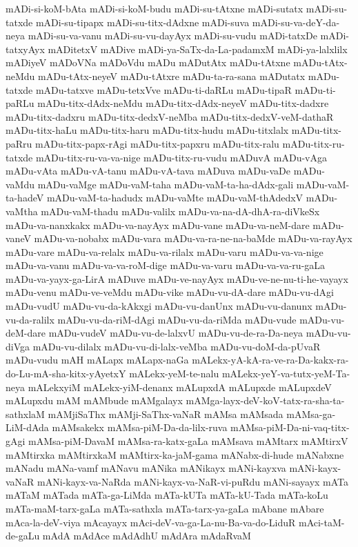 {mADi-si-koM-bAta
mADi-si-koM-budu
mADi-su-tAtxne
mADi-sutatx
mADi-su-tatxde
mADi-su-tipapx
mADi-su-titx-dAdxne
mADi-suva
mADi-su-va-deY-da-neya
mADi-su-va-vanu
mADi-su-vu-dayAyx
mADi-su-vudu
mADi-tatxDe
mADi-tatxyAyx
mADitetxV
mADive
mADi-ya-SaTx-da-La-padamxM
mADi-ya-lalxlilx
mADiyeV
mADoVNa
mADoVdu
mADu
mADutAtx
mADu-tAtxne
mADu-tAtx-neMdu
mADu-tAtx-neyeV
mADu-tAtxre
mADu-ta-ra-sana
mADutatx
mADu-tatxde
mADu-tatxve
mADu-tetxVve
mADu-ti-daRLu
mADu-tipaR
mADu-ti-paRLu
mADu-titx-dAdx-neMdu
mADu-titx-dAdx-neyeV
mADu-titx-dadxre
mADu-titx-dadxru
mADu-titx-dedxV-neMba
mADu-titx-dedxV-veM-dathaR
mADu-titx-haLu
mADu-titx-haru
mADu-titx-hudu
mADu-titxlalx
mADu-titx-paRru
mADu-titx-papx-rAgi
mADu-titx-papxru
mADu-titx-ralu
mADu-titx-ru-tatxde
mADu-titx-ru-va-va-nige
mADu-titx-ru-vudu
mADuvA
mADu-vAga
mADu-vAta
mADu-vA-tanu
mADu-vA-tava
mADuva
mADu-vaDe
mADu-vaMdu
mADu-vaMge
mADu-vaM-taha
mADu-vaM-ta-ha-dAdx-gali
mADu-vaM-ta-hadeV
mADu-vaM-ta-hadudx
mADu-vaMte
mADu-vaM-thAdedxV
mADu-vaMtha
mADu-vaM-thadu
mADu-valilx
mADu-va-na-dA-dhA-ra-diVkeSx
mADu-va-nanxkakx
mADu-va-nayAyx
mADu-vane
mADu-va-neM-dare
mADu-vaneV
mADu-va-nobabx
mADu-vara
mADu-va-ra-ne-na-baMde
mADu-va-rayAyx
mADu-vare
mADu-va-relalx
mADu-va-rilalx
mADu-varu
mADu-va-va-nige
mADu-va-vanu
mADu-va-va-roM-dige
mADu-va-varu
mADu-va-va-ru-gaLa
mADu-va-yayx-ga-LirA
mADuve
mADu-ve-nayAyx
mADu-ve-ne-nu-ti-he-vayayx
mADu-venu
mADu-ve-veMdu
mADu-vike
mADu-vu-dA-dare
mADu-vu-dAgi
mADu-vudU
mADu-vu-da-kAkxgi
mADu-vu-danUnx
mADu-vu-danunx
mADu-vu-da-ralilx
mADu-vu-da-riM-dAgi
mADu-vu-da-riMda
mADu-vude
mADu-vu-deM-dare
mADu-vudeV
mADu-vu-de-lalxvU
mADu-vu-de-ra-Da-neya
mADu-vu-diVga
mADu-vu-dilalx
mADu-vu-di-lalx-veMba
mADu-vu-doM-da-pUvaR
mADu-vudu
mAH
mALapx
mALapx-naGa
mALekx-yA-kA-ra-ve-ra-Da-kakx-ra-do-Lu-mA-sha-kitx-yAyetxY
mALekx-yeM-te-nalu
mALekx-yeY-va-tutx-yeM-Ta-neya
mALekxyiM
mALekx-yiM-denanx
mALupxdA
mALupxde
mALupxdeV
mALupxdu
mAM
mAMbude
mAMgalayx
mAMga-layx-deV-koV-tatx-ra-sha-ta-sathxlaM
mAMjiSaThx
mAMji-SaThx-vaNaR
mAMsa
mAMsada
mAMsa-ga-LiM-dAda
mAMsakekx
mAMsa-piM-Da-da-lilx-ruva
mAMsa-piM-Da-ni-vaq-titx-gAgi
mAMsa-piM-DavaM
mAMsa-ra-katx-gaLa
mAMsava
mAMtarx
mAMtirxV
mAMtirxka
mAMtirxkaM
mAMtirx-ka-jaM-gama
mANabx-di-hude
mANabxne
mANadu
mANa-vamf
mANavu
mANika
mANikayx
mANi-kayxva
mANi-kayx-vaNaR
mANi-kayx-va-NaRda
mANi-kayx-va-NaR-vi-puRdu
mANi-sayayx
mATa
mATaM
mATada
mATa-ga-LiMda
mATa-kUTa
mATa-kU-Tada
mATa-koLu
mATa-maM-tarx-gaLa
mATa-sathxla
mATa-tarx-ya-gaLa
mAbane
mAbare
mAca-la-deV-viya
mAcayayx
mAci-deV-va-ga-La-nu-Ba-va-do-LiduR
mAci-taM-de-gaLu
mAdA
mAdAce
mAdAdhU
mAdAra
mAdaRvaM
}
